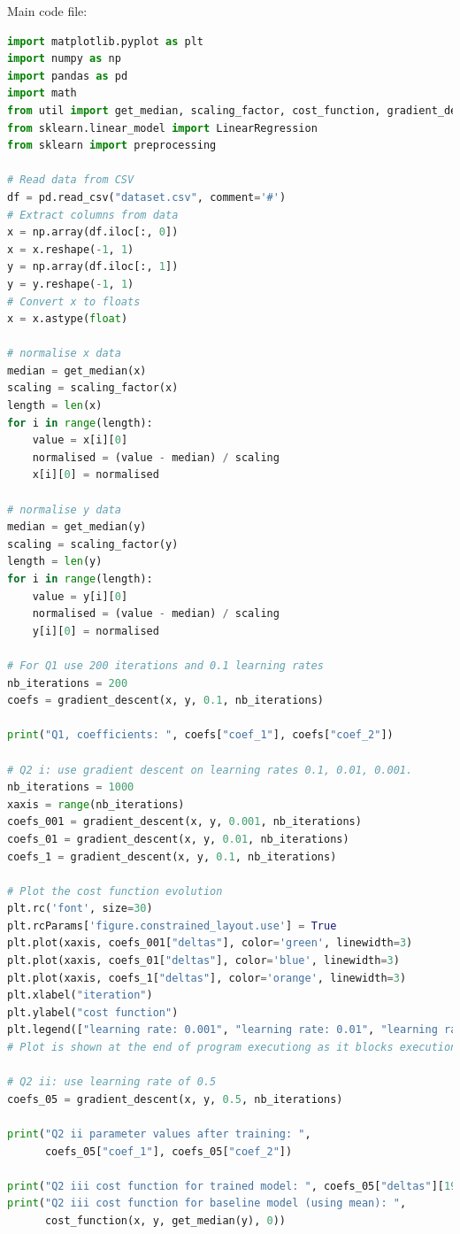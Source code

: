 \documentclass[10pt]{article}
\begin{document}
Main code file:
\begin{lstlisting}[language=Python]
import matplotlib.pyplot as plt
import numpy as np
import pandas as pd
import math
from util import get_median, scaling_factor, cost_function, gradient_descent
from sklearn.linear_model import LinearRegression
from sklearn import preprocessing

# Read data from CSV
df = pd.read_csv("dataset.csv", comment='#')
# Extract columns from data
x = np.array(df.iloc[:, 0])
x = x.reshape(-1, 1)
y = np.array(df.iloc[:, 1])
y = y.reshape(-1, 1)
# Convert x to floats
x = x.astype(float)

# normalise x data
median = get_median(x)
scaling = scaling_factor(x)
length = len(x)
for i in range(length):
    value = x[i][0]
    normalised = (value - median) / scaling
    x[i][0] = normalised

# normalise y data
median = get_median(y)
scaling = scaling_factor(y)
length = len(y)
for i in range(length):
    value = y[i][0]
    normalised = (value - median) / scaling
    y[i][0] = normalised

# For Q1 use 200 iterations and 0.1 learning rates
nb_iterations = 200
coefs = gradient_descent(x, y, 0.1, nb_iterations)

print("Q1, coefficients: ", coefs["coef_1"], coefs["coef_2"])

# Q2 i: use gradient descent on learning rates 0.1, 0.01, 0.001.
nb_iterations = 1000
xaxis = range(nb_iterations)
coefs_001 = gradient_descent(x, y, 0.001, nb_iterations)
coefs_01 = gradient_descent(x, y, 0.01, nb_iterations)
coefs_1 = gradient_descent(x, y, 0.1, nb_iterations)

# Plot the cost function evolution
plt.rc('font', size=30)
plt.rcParams['figure.constrained_layout.use'] = True
plt.plot(xaxis, coefs_001["deltas"], color='green', linewidth=3)
plt.plot(xaxis, coefs_01["deltas"], color='blue', linewidth=3)
plt.plot(xaxis, coefs_1["deltas"], color='orange', linewidth=3)
plt.xlabel("iteration")
plt.ylabel("cost function")
plt.legend(["learning rate: 0.001", "learning rate: 0.01", "learning rate: 0.1"])
# Plot is shown at the end of program executiong as it blocks execution otherwise.

# Q2 ii: use learning rate of 0.5
coefs_05 = gradient_descent(x, y, 0.5, nb_iterations)

print("Q2 ii parameter values after training: ",
      coefs_05["coef_1"], coefs_05["coef_2"])

print("Q2 iii cost function for trained model: ", coefs_05["deltas"][199])
print("Q2 iii cost function for baseline model (using mean): ",
      cost_function(x, y, get_median(y), 0))


\end{lstlisting}
\end{document}
